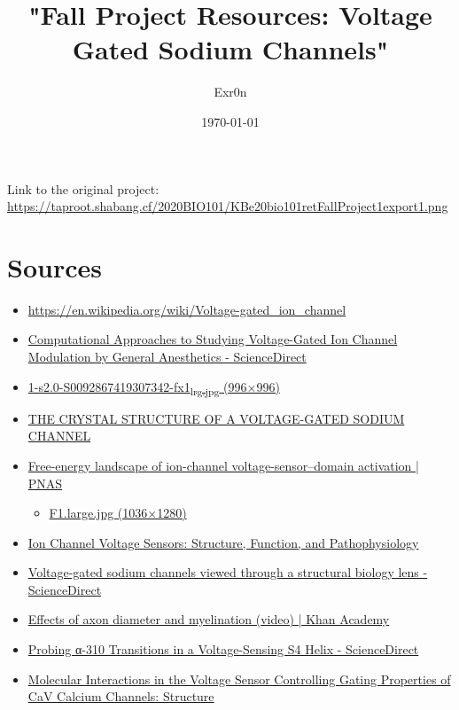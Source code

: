 \documentclass[letterpaper]{article}
\author{Exr0n}
\date{\today}
\title{"Fall Project Resources: Voltage Gated Sodium Channels"}
\renewcommand\maketitle{}
\begin{document}
\maketitle
Link to the original project: \url{https://taproot.shabang.cf/2020BIO101/KBe20bio101retFallProject1export1.png}

\section{Sources}
\label{sec:org2fb5358}
\begin{itemize}
\item \url{https://en.wikipedia.org/wiki/Voltage-gated\_ion\_channel}
\item \href{https://www.sciencedirect.com/science/article/pii/S0076687918300156}{Computational Approaches to Studying Voltage-Gated Ion Channel Modulation by General Anesthetics - ScienceDirect}
\item \href{https://ars.els-cdn.com/content/image/1-s2.0-S0092867419307342-fx1\_lrg.jpg}{1-s2.0-S0092867419307342-fx1\textsubscript{lrg.jpg} (996×996)}
\item \href{https://www.ncbi.nlm.nih.gov/pmc/articles/PMC3266868/}{THE CRYSTAL STRUCTURE OF A VOLTAGE-GATED SODIUM CHANNEL}
\item \href{https://www.pnas.org/content/112/1/124/tab-figures-data}{Free-energy landscape of ion-channel voltage-sensor–domain activation | PNAS}
\begin{itemize}
\item \href{https://www.pnas.org/content/pnas/112/1/124/F1.large.jpg}{F1.large.jpg (1036×1280)}
\end{itemize}
\item \href{https://www.ncbi.nlm.nih.gov/pmc/articles/PMC2950829/}{Ion Channel Voltage Sensors: Structure, Function, and Pathophysiology}
\item \href{https://www.sciencedirect.com/science/article/abs/pii/S0959440X16301506}{Voltage-gated sodium channels viewed through a structural biology lens - ScienceDirect}
\item \href{https://www.khanacademy.org/science/health-and-medicine/nervous-system-and-sensory-infor/neuron-membrane-potentials-topic/v/effects-of-axon-diameter-and-myelination}{Effects of axon diameter and myelination (video) | Khan Academy}
\item \href{https://www.sciencedirect.com/science/article/pii/S0006349514007875}{Probing α-310 Transitions in a Voltage-Sensing S4 Helix - ScienceDirect}
\item \href{https://www.cell.com/structure/fulltext/S0969-2126(15)00500-6?\_returnURL=https\%3A\%2F\%2Flinkinghub.elsevier.com\%2Fretrieve\%2Fpii\%2FS0969212615005006\%3Fshowall\%3Dtrue}{Molecular Interactions in the Voltage Sensor Controlling Gating Properties of CaV Calcium Channels: Structure}

\end{itemize}
\end{document}
